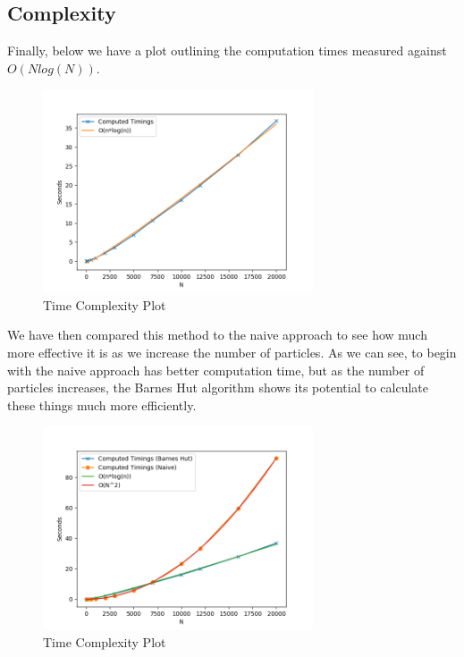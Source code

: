 \subsection{Complexity}
Finally, below we have a plot outlining the computation times measured against $O(Nlog(N))$.
\begin{figure}[htb]
    \begin{center}
        \includegraphics[width=8cm]{../images/nlogn.jpg}
        \caption{Time Complexity Plot}
    \end{center}
\end{figure}

We have then compared this method to the naive approach to see how much more effective it is as we increase the number of particles. As we can see, to begin with the naive approach has better computation time, but as the number of particles increases, the Barnes Hut algorithm shows its potential to calculate these things much more efficiently.
\begin{figure}[htb]
    \begin{center}
        \includegraphics[width=8cm]{../images/complexity_compare.png}
        \caption{Time Complexity Plot}
    \end{center}
\end{figure}
\newpage
